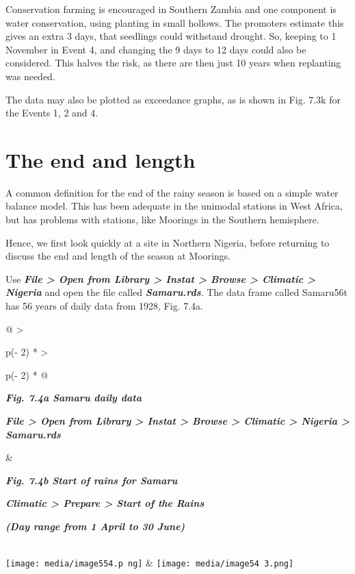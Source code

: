 \documentclass[
  letterpaper,
  DIV=11,
  numbers=noendperiod]{scrreprt}
\begin{document}
Conservation farming is encouraged in Southern Zambia and one component
is water conservation, using planting in small hollows. The promoters
estimate this gives an extra 3 days, that seedlings could withstand
drought. So, keeping to 1 November in Event 4, and changing the 9 days
to 12 days could also be considered. This halves the risk, as there are
then just 10 years when replanting was needed.

The data may also be plotted as exceedance graphs, as is shown in Fig.
7.3k for the Events 1, 2 and 4.

\section{The end and length}\label{the-end-and-length}

A common definition for the end of the rainy season is based on a simple
water balance model. This has been adequate in the unimodal stations in
West Africa, but has problems with stations, like Moorings in the
Southern hemisphere.

Hence, we first look quickly at a site in Northern Nigeria, before
returning to discuss the end and length of the season at Moorings.

Use \textbf{\emph{File \textgreater{} Open from Library \textgreater{}
Instat \textgreater{} Browse \textgreater{} Climatic \textgreater{}
Nigeria}} and open the file called \textbf{\emph{Samaru.rds}}. The data
frame called Samaru56t has 56 years of daily data from 1928, Fig. 7.4a.

\begin{longtable}[]{@{}
  >{\raggedright\arraybackslash}p{(\columnwidth - 2\tabcolsep) * }
  >{\raggedright\arraybackslash}p{(\columnwidth - 2\tabcolsep) * }@{}}
\toprule\noalign{}
\begin{minipage}[b]{\linewidth}\raggedright
\textbf{\emph{Fig. 7.4a Samaru daily data}}

\textbf{\emph{File \textgreater{} Open from Library \textgreater{}
Instat \textgreater{} Browse \textgreater{} Climatic \textgreater{}
Nigeria \textgreater{} Samaru.rds}}
\end{minipage} & \begin{minipage}[b]{\linewidth}\raggedright
\textbf{\emph{Fig. 7.4b Start of rains for Samaru}}

\textbf{\emph{Climatic \textgreater{} Prepare \textgreater{} Start of
the Rains}}

\textbf{\emph{(Day range from 1 April to 30 June)}}
\end{minipage} \\
\midrule\noalign{}
\endhead
\bottomrule\noalign{}
\endlastfoot
\texttt{[image: media/image554.p ng]}
&
\texttt{[image: media/image54 3.png]} \\
\end{longtable}
\end{document}
